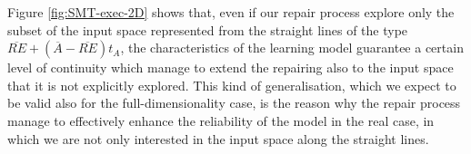 Figure \ref{fig:SMT-exec-2D} shows that, even if our repair process explore only the subset of the input space represented from the straight lines of the type $\overline{RE} + (\overline{A} - \overline{RE})t_{A}$, the characteristics of the learning model guarantee a certain level of continuity which manage to extend the repairing also to the input space that it is not explicitly explored. This kind of generalisation, which we expect to be valid also for the full-dimensionality case, is the reason why the repair process manage to effectively enhance the reliability of the model in the real case, in which we are not only interested in the input space along the straight lines.